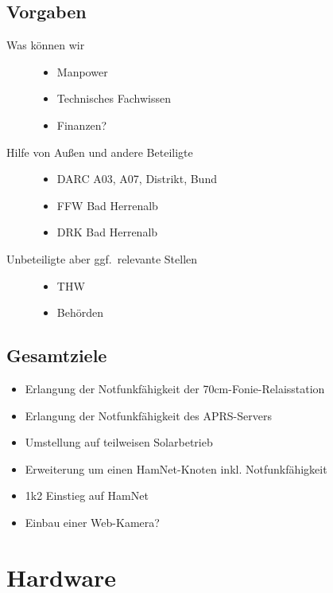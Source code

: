 \documentclass[a4paper]{scrartcl}
\begin{document}
\subsection{Vorgaben}
\begin{description}
    \item[Was k\"onnen wir]
        \begin{itemize}
            \item Manpower
            \item Technisches Fachwissen
            \item Finanzen?
        \end{itemize}
    \item[Hilfe von Au\ss{}en und andere Beteiligte]
        \begin{itemize}
            \item DARC A03, A07, Distrikt, Bund
            \item FFW Bad Herrenalb
            \item DRK Bad Herrenalb
        \end{itemize}
    \item[Unbeteiligte aber ggf.\ relevante Stellen]
        \begin{itemize}
            \item THW
            \item Beh\"orden
        \end{itemize}
\end{description}

\subsection{Gesamtziele}
\begin{itemize}
    \item Erlangung der Notfunkf\"ahigkeit der 70cm-Fonie-Relaisstation
    \item Erlangung der Notfunkf\"ahigkeit des APRS-Servers
    \item Umstellung auf teilweisen Solarbetrieb
    \item Erweiterung um einen HamNet-Knoten inkl. Notfunkf\"ahigkeit
    \item 1k2 Einstieg auf HamNet
    \item Einbau einer Web-Kamera?
\end{itemize}


\section{Hardware}
\end{document}
